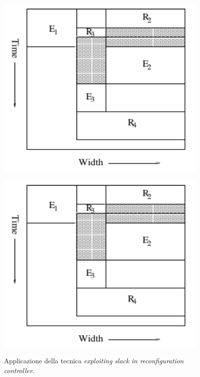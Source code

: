 \begin{figure}[t]
\begin{minipage}[b]{0.4\textwidth}
 \begin{center}
\includegraphics[width=\linewidth]{capitoli/figure/cap2/SlackRecController1.pdf}
\label{fig:slackRecController1}
 \end{center}
\end{minipage}
\hfill
\begin{minipage}[b]{0.4\textwidth}
 \begin{center}
\includegraphics[width=\linewidth]{capitoli/figure/cap2/SlackRecController1.pdf}
\label{fig:slackRecController2}
 \end{center}
\end{minipage}
\caption{Applicazione della tecnica \emph{exploiting slack in reconfiguration 
controller}.}
\label{fig:slackRecController}
\end{figure}

